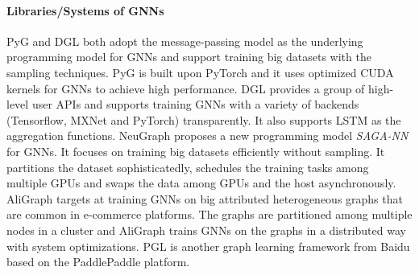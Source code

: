\paragraph{Libraries/Systems of GNNs}

PyG \cite{PyG} and DGL \cite{DGL} both adopt the message-passing model as the underlying programming model for GNNs and support training big datasets with the sampling techniques.
PyG \cite{PyG} is built upon PyTorch and it uses optimized CUDA kernels for GNNs to achieve high performance.
DGL \cite{DGL} provides a group of high-level user APIs and supports training GNNs with a variety of backends (Tensorflow, MXNet and PyTorch) transparently.
It also supports LSTM as the aggregation functions.
NeuGraph \cite{ma2019_neugraph} proposes a new programming model \emph{SAGA-NN} for GNNs.
It focuses on training big datasets efficiently without sampling.
It partitions the dataset sophisticatedly, schedules the training tasks among multiple GPUs and swaps the data among GPUs and the host asynchronously.
AliGraph \cite{zhu2019_aligraph} targets at training GNNs on big attributed heterogeneous graphs that are common in e-commerce platforms.
The graphs are partitioned among multiple nodes in a cluster and AliGraph trains GNNs on the graphs in a distributed way with system optimizations.
PGL \cite{PGL} is another graph learning framework from Baidu based on the PaddlePaddle platform.
